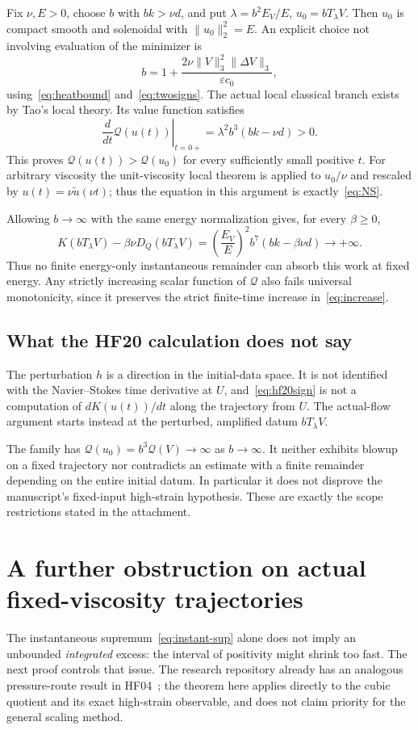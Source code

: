 \documentclass[11pt,a4paper]{article}
\theoremstyle{definition}
\newcommand{\Q}{\mathcal Q}
\newcommand{\eps}{\varepsilon}
\begin{document}
Fix $\nu,E>0$, choose $b$ with $bk>\nu d$, and put $\lambda=b^2E_V/E$, $u_0=bT_\lambda V$. Then $u_0$ is compact smooth and solenoidal with $\|u_0\|_2^2=E$. An explicit choice not involving evaluation of the minimizer is
\[
 b=1+\frac{2\nu\|V\|_3^2\|\Delta V\|_3}{\eps c_0},
\]
using~\eqref{eq:heatbound} and~\eqref{eq:twosigns}. The actual local classical branch exists by Tao's local theory. Its value function satisfies
\begin{equation}\label{eq:increase}
 \left.\frac{d}{dt}\Q(u(t))\right|_{t=0+}
 =\lambda^2b^3(bk-\nu d)>0.
\end{equation}
This proves $\Q(u(t))>\Q(u_0)$ for every sufficiently small positive $t$. For arbitrary viscosity the unit-viscosity local theorem is applied to $u_0/\nu$ and rescaled by $u(t)=\nu\widetilde u(\nu t)$; thus the equation in this argument is exactly~\eqref{eq:NS}.

Allowing $b\to\infty$ with the same energy normalization gives, for every $\beta\ge0$,
\begin{equation}\label{eq:instant-sup}
 K(bT_\lambda V)-\beta\nu D_Q(bT_\lambda V)
 =\left(\frac{E_V}{E}\right)^2b^7(bk-\beta\nu d)
 \longrightarrow+\infty.
\end{equation}
Thus no finite energy-only instantaneous remainder can absorb this work at fixed energy. Any strictly increasing scalar function of $\Q$ also fails universal monotonicity, since it preserves the strict finite-time increase in~\eqref{eq:increase}.

\subsection{What the HF20 calculation does not say}
The perturbation $h$ is a direction in the initial-data space. It is not identified with the Navier--Stokes time derivative at $U$, and~\eqref{eq:hf20sign} is not a computation of $dK(u(t))/dt$ along the trajectory from $U$. The actual-flow argument starts instead at the perturbed, amplified datum $bT_\lambda V$.

The family has $\Q(u_0)=b^3\Q(V)\to\infty$ as $b\to\infty$. It neither exhibits blowup on a fixed trajectory nor contradicts an estimate with a finite remainder depending on the entire initial datum. In particular it does not disprove the manuscript's fixed-input high-strain hypothesis. These are exactly the scope restrictions stated in the attachment.

\section{A further obstruction on actual fixed-viscosity trajectories}\label{sec:spacetime}
The instantaneous supremum~\eqref{eq:instant-sup} alone does not imply an unbounded \emph{integrated} excess: the interval of positivity might shrink too fast. The next proof controls that issue. The research repository already has an analogous pressure-route result in HF04~\cite{Navier}; the theorem here applies directly to the cubic quotient and its exact high-strain observable, and does not claim priority for the general scaling method.
\end{document}
